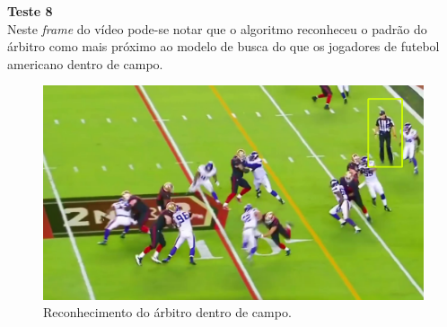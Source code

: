 \textbf{Teste 8}\\
Neste \textit{frame} do vídeo pode-se notar que o algoritmo reconheceu o padrão do árbitro como mais próximo ao modelo de busca do que os jogadores de futebol americano dentro de campo.
\begin{figure}
    \centering
    \caption{Reconhecimento do árbitro dentro de campo.}
    \includegraphics[scale=0.2]{05-SLIDES_DESENVOLVIMENTO/Etapa_de_Testes/imagens_testes/identificacao_jogadores_fa6.png}
\end{figure}
